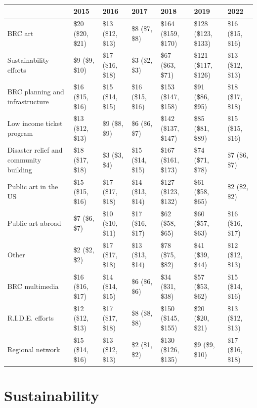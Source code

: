 \documentclass[
]{book}
\begin{document}
\begin{table}
\centering
\begin{tabular}[t]{>{}l|>{}l|>{}l|>{}l|>{}l|>{}l|>{}l}
\hline
  & 2015 & 2016 & 2017 & 2018 & 2019 & 2022\\
\hline
BRC art & \$20 (\$20, \$21) & \$13 (\$12, \$13) & \$8 (\$7, \$8) & \$164 (\$159, \$170) & \$128 (\$123, \$133) & \$16 (\$15, \$16)\\
\hline
Sustainability 
 efforts & \$9 (\$9, \$10) & \$17 (\$16, \$18) & \$3 (\$2, \$3) & \$67 (\$63, \$71) & \$121 (\$117, \$126) & \$13 (\$12, \$13)\\
\hline
BRC planning and 
 infrastructure & \$16 (\$15, \$16) & \$15 (\$14, \$15) & \$16 (\$15, \$16) & \$153 (\$147, \$158) & \$91 (\$86, \$95) & \$18 (\$17, \$18)\\
\hline
Low income 
 ticket program & \$13 (\$12, \$13) & \$9 (\$8, \$9) & \$6 (\$6, \$7) & \$142 (\$137, \$147) & \$85 (\$81, \$89) & \$15 (\$15, \$16)\\
\hline
Disaster relief and 
 community building & \$18 (\$17, \$18) & \$3 (\$3, \$4) & \$15 (\$14, \$15) & \$167 (\$161, \$173) & \$74 (\$71, \$78) & \$7 (\$6, \$7)\\
\hline
Public art 
 in the US & \$15 (\$15, \$16) & \$17 (\$17, \$18) & \$14 (\$13, \$14) & \$127 (\$123, \$132) & \$61 (\$58, \$65) & \$2 (\$2, \$2)\\
\hline
Public art 
 abroad & \$7 (\$6, \$7) & \$10 (\$10, \$11) & \$17 (\$16, \$17) & \$62 (\$58, \$65) & \$60 (\$57, \$63) & \$16 (\$16, \$17)\\
\hline
Other & \$2 (\$2, \$2) & \$17 (\$17, \$18) & \$13 (\$13, \$14) & \$78 (\$75, \$82) & \$41 (\$39, \$44) & \$12 (\$12, \$13)\\
\hline
BRC multimedia & \$16 (\$16, \$17) & \$14 (\$14, \$15) & \$6 (\$6, \$6) & \$34 (\$31, \$38) & \$57 (\$53, \$62) & \$15 (\$14, \$16)\\
\hline
R.I.D.E. 
 efforts & \$12 (\$12, \$13) & \$17 (\$17, \$18) & \$8 (\$8, \$8) & \$150 (\$145, \$155) & \$20 (\$20, \$21) & \$13 (\$12, \$13)\\
\hline
Regional 
 network & \$15 (\$14, \$16) & \$13 (\$12, \$13) & \$2 (\$1, \$2) & \$130 (\$126, \$135) & \$9 (\$9, \$10) & \$17 (\$16, \$18)\\
\hline
\end{tabular}
\end{table}

\hypertarget{sustainability}{%
\section{Sustainability}\label{sustainability}}
\end{document}
